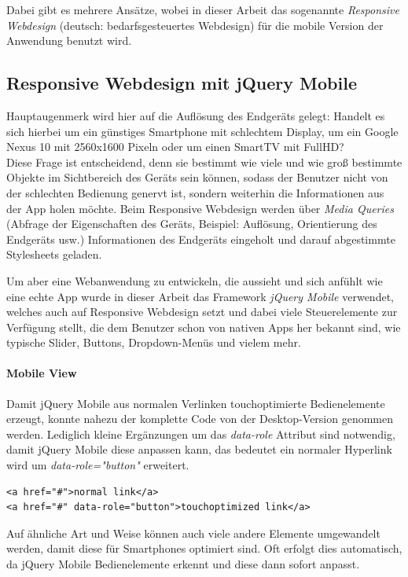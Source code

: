 Dabei gibt es mehrere Ansätze, wobei in dieser Arbeit das sogenannte \emph{Responsive Webdesign} (deutsch: bedarfsgesteuertes Webdesign) für die mobile Version der Anwendung benutzt wird.

\subsection{Responsive Webdesign mit jQuery Mobile}
Hauptaugenmerk wird hier auf die Auflösung des Endgeräts gelegt: Handelt es sich hierbei um ein günstiges Smartphone mit schlechtem Display, um ein Google Nexus 10 mit 2560x1600 Pixeln oder um einen SmartTV mit FullHD?\\
Diese Frage ist entscheidend, denn sie bestimmt wie viele und wie groß bestimmte Objekte im Sichtbereich des Geräts sein können, sodass der Benutzer nicht von der schlechten Bedienung genervt ist, sondern weiterhin die Informationen aus der App holen möchte. Beim Responsive Webdesign werden über \emph{Media Queries} (Abfrage der Eigenschaften des Geräts, Beispiel: Auflösung, Orientierung des Endgeräts usw.) Informationen des Endgeräts eingeholt und darauf abgestimmte Stylesheets geladen.\par

Um aber eine Webanwendung zu entwickeln, die aussieht und sich \glqq anfühlt\grqq{} wie eine echte App wurde in dieser Arbeit das Framework \emph{jQuery Mobile} verwendet, welches auch auf Responsive Webdesign setzt und dabei viele Steuerelemente zur Verfügung stellt, die dem Benutzer schon von nativen Apps her bekannt sind, wie typische Slider, Buttons, Dropdown-Menüs und vielem mehr.

\paragraph{Mobile View}
Damit jQuery Mobile aus normalen Verlinken touchoptimierte Bedienelemente erzeugt, konnte nahezu der komplette Code von der Desktop-Version genommen werden. Lediglich kleine Ergänzungen um das \emph{data-role} Attribut sind notwendig, damit jQuery Mobile diese anpassen kann, das bedeutet ein normaler Hyperlink wird um \emph{data-role="button"} erweitert.
\\
\begin{lstlisting}[captionpos=b, caption=Eine kleine Ergänzung erzeugt aus einem Link einen touchfreundlichen Button]
<a href="#">normal link</a>
<a href="#" data-role="button">touchoptimized link</a>
\end{lstlisting}

Auf ähnliche Art und Weise können auch viele andere Elemente umgewandelt werden, damit diese für Smartphones optimiert sind. Oft erfolgt dies automatisch, da jQuery Mobile Bedienelemente erkennt und diese dann sofort anpasst.
